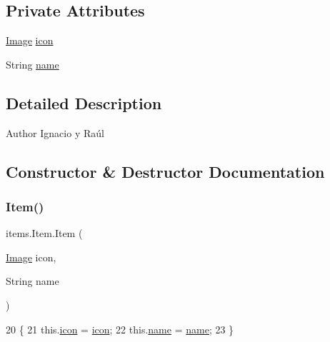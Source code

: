 \subsection*{Private Attributes}
\begin{DoxyCompactItemize}
\item 
\mbox{\hyperlink{classorg_1_1newdawn_1_1slick_1_1_image}{Image}} \mbox{\hyperlink{classitems_1_1_item_afa445ad011d48c3455b0c04bec2581f9}{icon}}
\item 
String \mbox{\hyperlink{classitems_1_1_item_a086327df1ba046bbbe3fa2f753226d73}{name}}
\end{DoxyCompactItemize}


\subsection{Detailed Description}
\begin{DoxyAuthor}{Author}
Ignacio y Raúl 
\end{DoxyAuthor}


\subsection{Constructor \& Destructor Documentation}
\mbox{\label{classitems_1_1_item_a4c590ea0fc7a232106485d3b45a6c037}} 
\subsubsection{\texorpdfstring{Item()}{Item()}}
{\footnotesize\ttfamily items.\+Item.\+Item (\begin{DoxyParamCaption}\item[{\mbox{\hyperlink{classorg_1_1newdawn_1_1slick_1_1_image}{Image}}}]{icon,  }\item[{String}]{name }\end{DoxyParamCaption})\hspace{0.3cm}{\ttfamily [inline]}}


\begin{DoxyCode}
20                                          \{
21         this.\mbox{\hyperlink{classitems_1_1_item_afa445ad011d48c3455b0c04bec2581f9}{icon}} = \mbox{\hyperlink{classitems_1_1_item_afa445ad011d48c3455b0c04bec2581f9}{icon}};
22         this.\mbox{\hyperlink{classitems_1_1_item_a086327df1ba046bbbe3fa2f753226d73}{name}} = \mbox{\hyperlink{classitems_1_1_item_a086327df1ba046bbbe3fa2f753226d73}{name}};
23     \}
\end{DoxyCode}


